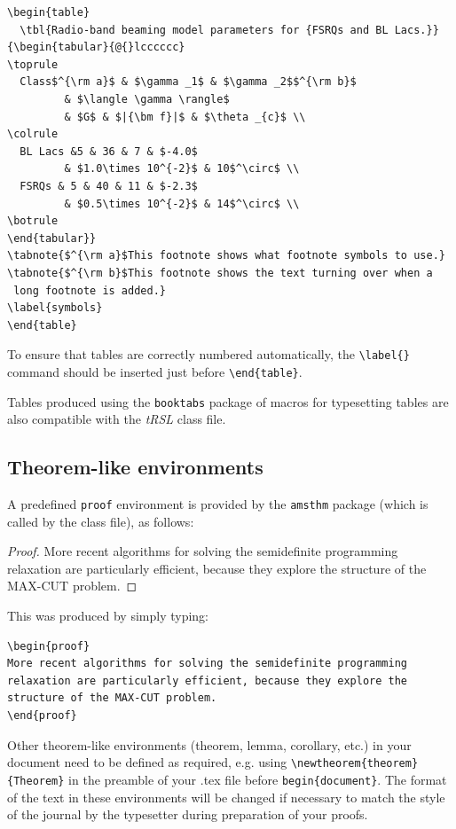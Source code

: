 \documentclass[]{tRSL2e}
\begin{document}
\begin{verbatim}
\begin{table}
  \tbl{Radio-band beaming model parameters for {FSRQs and BL Lacs.}}
{\begin{tabular}{@{}lcccccc}
\toprule
  Class$^{\rm a}$ & $\gamma _1$ & $\gamma _2$$^{\rm b}$
         & $\langle \gamma \rangle$
         & $G$ & $|{\bm f}|$ & $\theta _{c}$ \\
\colrule
  BL Lacs &5 & 36 & 7 & $-4.0$
         & $1.0\times 10^{-2}$ & 10$^\circ$ \\
  FSRQs & 5 & 40 & 11 & $-2.3$
         & $0.5\times 10^{-2}$ & 14$^\circ$ \\
\botrule
\end{tabular}}
\tabnote{$^{\rm a}$This footnote shows what footnote symbols to use.}
\tabnote{$^{\rm b}$This footnote shows the text turning over when a
 long footnote is added.}
\label{symbols}
\end{table}
\end{verbatim}

To ensure that tables are correctly numbered automatically, the \verb"\label{}" command should be inserted just before
\verb"\end{table}". 

Tables produced using the {\tt booktabs} package of macros for typesetting tables are also compatible with the {\it tRSL} class file.


\subsection{Theorem-like environments}

A predefined \verb"proof" environment is provided by the \verb"amsthm" package (which is called by the class file), as follows:

\begin{proof}
More recent algorithms for solving the semidefinite programming relaxation
are particularly efficient, because they explore the structure of the
MAX-CUT problem.
\end{proof}
\noindent This was produced by simply typing:
%
\begin{verbatim}
\begin{proof}
More recent algorithms for solving the semidefinite programming
relaxation are particularly efficient, because they explore the
structure of the MAX-CUT problem.
\end{proof}
\end{verbatim}
%
Other theorem-like environments (theorem, lemma, corollary, etc.) in your document need to be defined as required, e.g. using \verb"\newtheorem{theorem}{Theorem}" in the preamble of your .tex file before \verb"begin{document}". The format of the text in these environments will be changed if necessary to match the style of the journal by the typesetter during preparation of your proofs.
\end{document}
